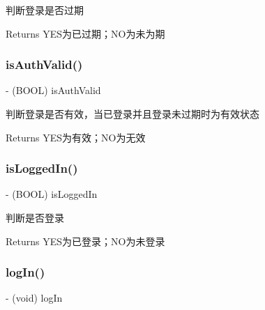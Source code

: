 判断登录是否过期 \begin{DoxyReturn}{Returns}
Y\+E\+S为已过期；\+N\+O为未为期 
\end{DoxyReturn}
\mbox{\label{interfaceSinaWeibo_a29d41dae95cdc485a2d49d4ac7091d84}} 
\subsubsection{\texorpdfstring{is\+Auth\+Valid()}{isAuthValid()}}
{\footnotesize\ttfamily -\/ (B\+O\+OL) is\+Auth\+Valid \begin{DoxyParamCaption}{ }\end{DoxyParamCaption}}

判断登录是否有效，当已登录并且登录未过期时为有效状态 \begin{DoxyReturn}{Returns}
Y\+E\+S为有效；\+N\+O为无效 
\end{DoxyReturn}
\mbox{\label{interfaceSinaWeibo_a9e6b35bab485a4a712486d323893f4a2}} 
\subsubsection{\texorpdfstring{is\+Logged\+In()}{isLoggedIn()}}
{\footnotesize\ttfamily -\/ (B\+O\+OL) is\+Logged\+In \begin{DoxyParamCaption}{ }\end{DoxyParamCaption}}

判断是否登录 \begin{DoxyReturn}{Returns}
Y\+E\+S为已登录；\+N\+O为未登录 
\end{DoxyReturn}
\mbox{\label{interfaceSinaWeibo_a953a72271fc1ece0b642989834068f18}} 
\subsubsection{\texorpdfstring{log\+In()}{logIn()}}
{\footnotesize\ttfamily -\/ (void) log\+In \begin{DoxyParamCaption}{ }\end{DoxyParamCaption}}

